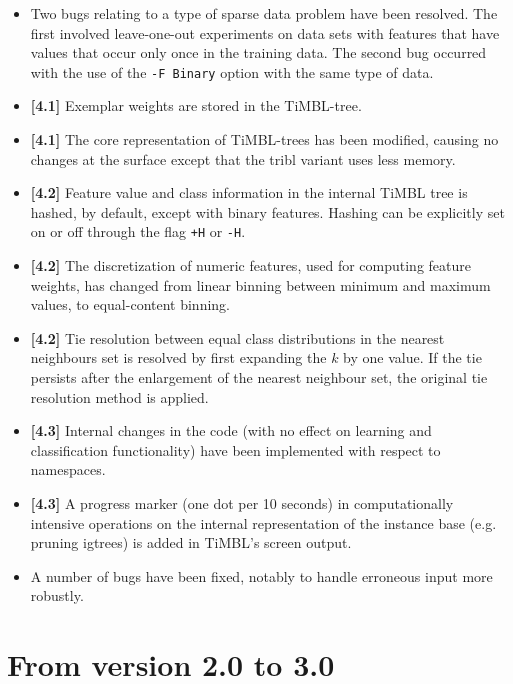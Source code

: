 \documentclass{report}
\begin{document}
\begin{itemize}
\item Two bugs relating to a type of sparse data problem have been
resolved. The first involved leave-one-out experiments on data sets
with features that have values that occur only once in the training
data. The second bug occurred with the use of the {\tt -F Binary}
option with the same type of data.

\item {\bf [4.1]} Exemplar weights are stored in the TiMBL-tree.

\item {\bf [4.1]} The core representation of
TiMBL-trees has been modified, causing no changes at the surface
except that the {\sc tribl} variant uses less memory.

\item {\bf [4.2]} Feature value and class information in the internal
TiMBL tree is hashed, by default, except with binary features. Hashing
can be explicitly set on or off through the flag {\tt +H} or {\tt -H}.

\item {\bf [4.2]} The discretization of numeric
features, used for computing feature weights, has changed from linear
binning between minimum and maximum values, to equal-content binning.

\item {\bf [4.2]} Tie resolution between equal
class distributions in the nearest neighbours set is resolved by first
expanding the $k$ by one value. If the tie persists after the
enlargement of the nearest neighbour set, the original tie resolution
method is applied.

\item {\bf [4.3]} Internal changes in the code (with no effect on
learning and classification functionality) have been implemented with
respect to namespaces.

\item {\bf [4.3]} A progress marker (one dot per 10 seconds) in
computationally intensive operations on the internal representation of
the instance base (e.g. pruning {\sc igtree}s) is added in TiMBL's
screen output.

\item A number of bugs have been fixed, notably to handle erroneous
input more robustly.

\end{itemize}

\section{From version 2.0 to 3.0}
\end{document}
